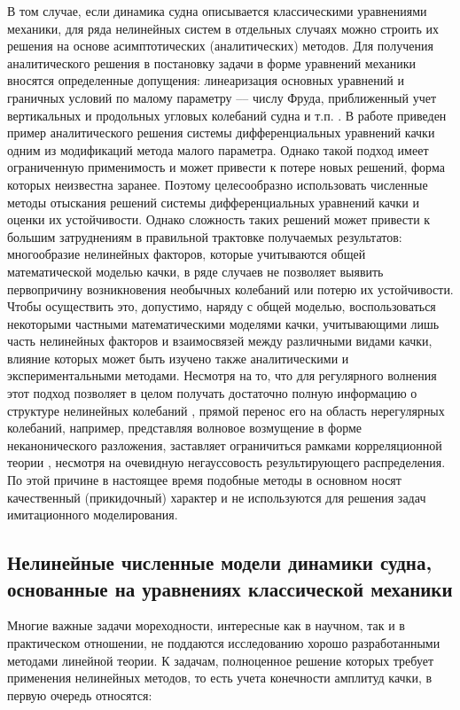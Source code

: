 В том случае, если динамика судна описывается классическими уравнениями механики, для ряда нелинейных систем в отдельных случаях можно строить их решения на основе асимптотических (аналитических) методов. Для получения аналитического решения в постановку задачи в форме уравнений механики вносятся определенные допущения: линеаризация основных уравнений и граничных условий по малому параметру --– числу Фруда, приближенный учет вертикальных и продольных угловых колебаний судна и т.п. \citep{dk16}. В работе \citep{dk17} приведен пример аналитического решения системы дифференциальных уравнений качки одним из модификаций метода малого параметра. Однако такой подход имеет ограниченную применимость и может привести к потере новых решений, форма которых неизвестна заранее. Поэтому целесообразно использовать численные методы отыскания решений системы дифференциальных уравнений качки и оценки их устойчивости. Однако сложность таких решений может привести к большим затруднениям в правильной трактовке получаемых результатов: многообразие нелинейных факторов, которые учитываются общей математической моделью качки, в ряде случаев не позволяет выявить первопричину возникновения необычных колебаний или потерю их устойчивости. Чтобы осуществить это, допустимо, наряду с общей моделью, воспользоваться некоторыми частными математическими моделями качки, учитывающими лишь часть нелинейных факторов и взаимосвязей между различными видами качки, влияние которых может быть изучено также аналитическими и экспериментальными методами. Несмотря на то, что для регулярного волнения этот подход позволяет в целом получать достаточно полную информацию о структуре нелинейных колебаний \citep{dk17}, прямой перенос его на область нерегулярных колебаний, например, представляя волновое возмущение в форме неканонического разложения, заставляет ограничиться рамками корреляционной теории \citep{dk18}, несмотря на очевидную негауссовость результирующего распределения. По этой причине в настоящее время подобные методы в основном носят качественный (прикидочный) характер и не используются для решения задач имитационного моделирования.

\subsection{Нелинейные численные модели динамики судна, основанные на уравнениях классической механики}
Многие важные задачи мореходности, интересные как в научном, так и в практическом отношении, не поддаются исследованию хорошо разработанными методами линейной теории. К задачам, полноценное решение которых требует применения нелинейных методов, то есть учета конечности амплитуд качки, в первую очередь относятся:

